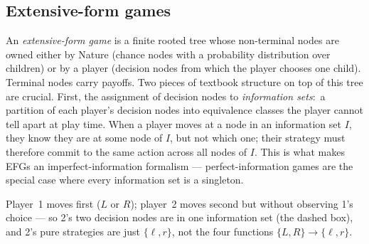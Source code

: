 \subsection{Extensive-form games}
\label{sec:languages:efg}

An \emph{extensive-form game} is a finite rooted tree whose
non-terminal nodes are owned either by Nature (chance nodes with
a probability distribution over children) or by a player (decision
nodes from which the player chooses one child).  Terminal nodes
carry payoffs.  Two pieces of textbook structure on top of this
tree are crucial.  First, the assignment of decision nodes to
\emph{information sets}:\ a partition of each player's decision
nodes into equivalence classes the player cannot tell apart at
play time.  When a player moves at a node in an information set
$I$, they know they are at some node of $I$, but not which one;
their strategy must therefore commit to the same action across
all nodes of $I$.  This is what makes EFGs an
imperfect-information formalism — perfect-information games are
the special case where every information set is a singleton.

\begin{center}
\end{center}

\noindent
Player~1 moves first ($L$ or $R$);  player~2 moves second but
without observing 1's choice — so 2's two decision nodes are in
one information set (the dashed box), and 2's pure strategies
are just $\{\ell, r\}$, not the four functions $\{L,R\}\to\{\ell,r\}$.

